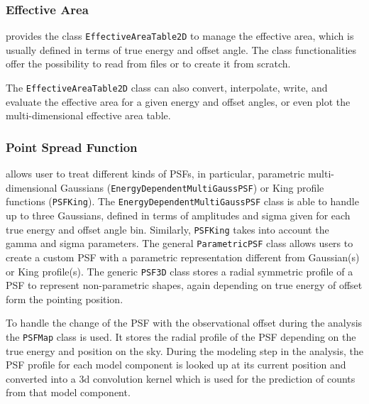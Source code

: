 \documentclass[traditabstract, longauth]{aa}
\newcommand{\code}[1]{\texttt{#1}}
\begin{document}
\subsubsection{Effective Area}
\gammapy provides the class \code{EffectiveAreaTable2D} to
manage the effective area, which is usually defined in terms of true energy and offset angle.
The class functionalities offer the possibility to read from files or to create
it from scratch. {The \code{EffectiveAreaTable2D} class can also convert, interpolate,
write, and evaluate the effective area for a given energy and offset angles, or
even plot the multi-dimensional effective area table.

\subsubsection{Point Spread Function}
\gammapy allows user to treat different kinds of PSFs,
in particular, parametric multi-dimensional Gaussians (\code{EnergyDependentMultiGaussPSF})
or King profile functions (\code{PSFKing}). The \code{EnergyDependentMultiGaussPSF}
 class is able to handle up to three
Gaussians, defined in terms of amplitudes and sigma given for each true energy
and offset angle bin. Similarly, \code{PSFKing} takes into account the gamma and
sigma parameters. The general \code{ParametricPSF} class allows users to create a
custom PSF with a parametric representation different from Gaussian(s) or King profile(s).
The generic \code{PSF3D} class stores a radial symmetric profile of a
PSF to represent non-parametric shapes, again depending on true energy
of offset form the pointing position.

To handle the change of the PSF with the observational offset during the analysis 
the \code{PSFMap} class is used. It stores the radial profile of the PSF
depending on the true energy and position on the sky. During the modeling
step in the analysis, the PSF profile for each model component is 
looked up at its current position and converted into a 3d convolution kernel
which is used for the prediction of counts from that model component.


}
\end{document}
